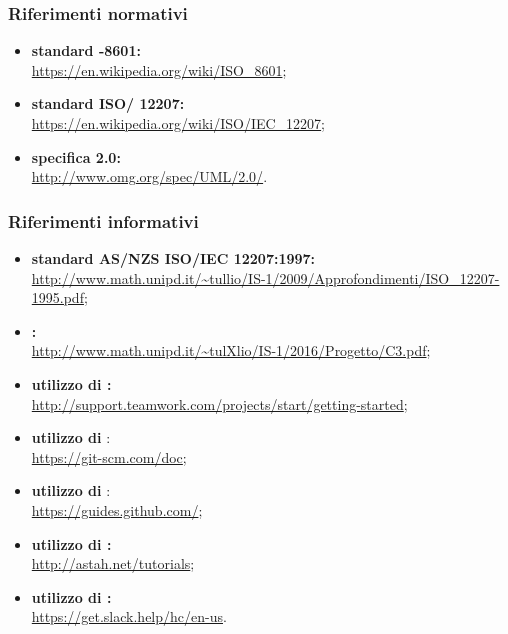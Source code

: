         \subsubsection{Riferimenti normativi}
        \begin{itemize}
            \item \textbf{standard -8601:}\\ \url{https://en.wikipedia.org/wiki/ISO_8601}; \label{sec:iso8601}
            \item \textbf{standard ISO/ 12207:}\\ \url{https://en.wikipedia.org/wiki/ISO/IEC_12207};
            \item \textbf{specifica  2.0:}\\ \url{http://www.omg.org/spec/UML/2.0/}.
        \end{itemize}

        \subsubsection{Riferimenti informativi} \label{sec:riferimenti}
        \begin{itemize}
            \item \textbf{standard AS/NZS ISO/IEC 12207:1997:}\\ \url{http://www.math.unipd.it/~tullio/IS-1/2009/Approfondimenti/ISO_12207-1995.pdf}; \label{sec:isoiec}
            \item \textbf{:}\\ \url{http://www.math.unipd.it/~tulXlio/IS-1/2016/Progetto/C3.pdf};
            \item \textbf{utilizzo di :}\\ \url{http://support.teamwork.com/projects/start/getting-started};
            \item \textbf{utilizzo di }:\\ \url{https://git-scm.com/doc};
            \item \textbf{utilizzo di }:\\ \url{https://guides.github.com/};
            \item \textbf{utilizzo di :}\\ \url{http://astah.net/tutorials};
            \item \textbf{utilizzo di :}\\ \url{https://get.slack.help/hc/en-us}.
        \end{itemize}
